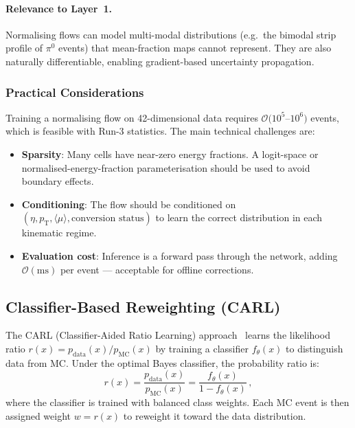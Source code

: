 \documentclass[11pt,a4paper]{article}
\newcommand{\avgmu}{\langle\mu\rangle}
\begin{document}
\paragraph{Relevance to Layer~1.}
Normalising flows can model multi-modal distributions (e.g.\ the
bimodal strip profile of $\pi^0$ events) that mean-fraction maps
cannot represent.  They are also naturally differentiable, enabling
gradient-based uncertainty propagation.

\subsubsection{Practical Considerations}

Training a normalising flow on 42-dimensional data requires
$\mathcal{O}(10^5$--$10^6)$ events, which is feasible with Run-3
statistics.  The main technical challenges are:
\begin{itemize}
  \item \textbf{Sparsity}: Many cells have near-zero energy fractions.
        A logit-space or normalised-energy-fraction parameterisation
        should be used to avoid boundary effects.
  \item \textbf{Conditioning}: The flow should be conditioned on
        $(\eta, p_\mathrm{T}, \avgmu, \text{conversion status})$
        to learn the correct distribution in each kinematic regime.
  \item \textbf{Evaluation cost}: Inference is a forward pass through
        the network, adding $\mathcal{O}(\mathrm{ms})$ per event —
        acceptable for offline corrections.
\end{itemize}

\subsection{Classifier-Based Reweighting (CARL)}
\label{sec:alternatives:carl}

The CARL (Classifier-Aided Ratio Learning) approach~\cite{CARL:2016}
learns the likelihood ratio
$r(x) = p_\mathrm{data}(x) / p_\mathrm{MC}(x)$
by training a classifier $f_\theta(x)$ to distinguish data
from MC.  Under the optimal Bayes classifier, the probability
ratio is:
\begin{equation}
  r(x) = \frac{p_\mathrm{data}(x)}{p_\mathrm{MC}(x)}
         = \frac{f_\theta(x)}{1 - f_\theta(x)}\,,
  \label{eq:carl}
\end{equation}
where the classifier is trained with balanced class weights.
Each MC event is then assigned weight $w = r(x)$ to reweight it
toward the data distribution.
\end{document}

